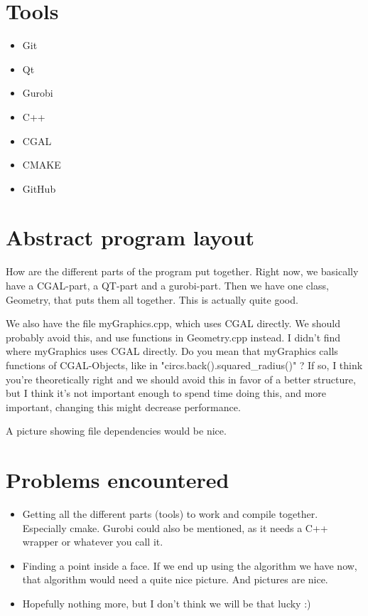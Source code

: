\documentclass[a4paper,12pt]{article}
\begin{document}
\section{Tools}
\begin{itemize}
\item
Git
\item
Qt
\item
Gurobi
\item
C++
\item
CGAL
\item
CMAKE
\item
GitHub
\end{itemize}

\section{Abstract program layout}
How are the different parts of the program put together. Right now, we basically have a CGAL-part, a QT-part and a gurobi-part. Then we have one class, Geometry, that puts them all together. This is actually quite good.

We also have the file myGraphics.cpp, which uses CGAL directly. We should probably avoid this, and use functions in Geometry.cpp instead.
I didn't find where myGraphics uses CGAL directly. Do you mean that myGraphics calls functions of CGAL-Objects, like in "circs.back().squared\_radius()" ?
If so, I think you're theoretically right and we should avoid this in favor of a better structure, but I think it's not important enough to spend time doing this, and more important, changing this might decrease performance.

A picture showing file dependencies would be nice.

\section{Problems encountered}
\begin{itemize}
\item
Getting all the different parts (tools) to work and compile together. Especially cmake. Gurobi could also be mentioned, as it needs a C++ wrapper or whatever you call it.
\item
Finding a point inside a face. If we end up using the algorithm we have now, that algorithm would need a quite nice picture. And pictures are nice.
\item
Hopefully nothing more, but I don't think we will be that lucky :)
\end{itemize}
\end{document}
